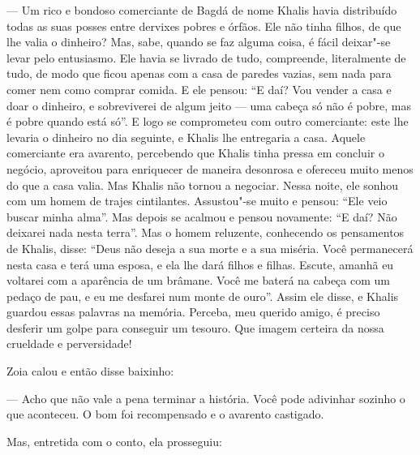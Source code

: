 --- Um rico e bondoso comerciante de Bagdá de nome Khalis havia
distribuído todas as suas posses entre dervixes pobres e órfãos. Ele não
tinha filhos, de que lhe valia o dinheiro? Mas, sabe, quando se faz
alguma coisa, é fácil deixar"-se levar pelo entusiasmo. Ele havia se
livrado de tudo, compreende, literalmente de tudo, de modo que ficou
apenas com a casa de paredes vazias, sem nada para comer nem como
comprar comida. E ele pensou: ``E daí? Vou vender a casa e doar o
dinheiro, e sobreviverei de algum jeito --- uma cabeça só não é pobre,
mas é pobre quando está só''. E logo se comprometeu com outro
comerciante: este lhe levaria o dinheiro no dia seguinte, e Khalis lhe
entregaria a casa. Aquele comerciante era avarento, percebendo que
Khalis tinha pressa em concluir o negócio, aproveitou para enriquecer de
maneira desonrosa e ofereceu muito menos do que a casa valia. Mas Khalis
não tornou a negociar. Nessa noite, ele sonhou com um homem de trajes
cintilantes. Assustou"-se muito e pensou: ``Ele veio buscar minha alma''.
Mas depois se acalmou e pensou novamente: ``E daí? Não deixarei nada
nesta terra''. Mas o homem reluzente, conhecendo os pensamentos de
Khalis, disse: ``Deus não deseja a sua morte e a sua miséria. Você
permanecerá nesta casa e terá uma esposa, e ela lhe dará filhos e
filhas. Escute, amanhã eu voltarei com a aparência de um brâmane. Você
me baterá na cabeça com um pedaço de pau, e eu me desfarei num monte de
ouro''. Assim ele disse, e Khalis guardou essas palavras na memória.
Perceba, meu querido amigo, é preciso desferir um golpe para conseguir
um tesouro. Que imagem certeira da nossa crueldade e perversidade! 

Zoia calou e então disse baixinho:

--- Acho que não vale a pena terminar a história. Você pode adivinhar
sozinho o que aconteceu. O bom foi recompensado e o avarento castigado.

Mas, entretida com o conto, ela prosseguiu:

